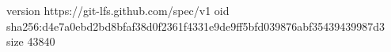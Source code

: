 version https://git-lfs.github.com/spec/v1
oid sha256:d4e7a0ebd2bd8bfaf38d0f2361f4331e9de9ff5bfd039876abf35439439987d3
size 43840
